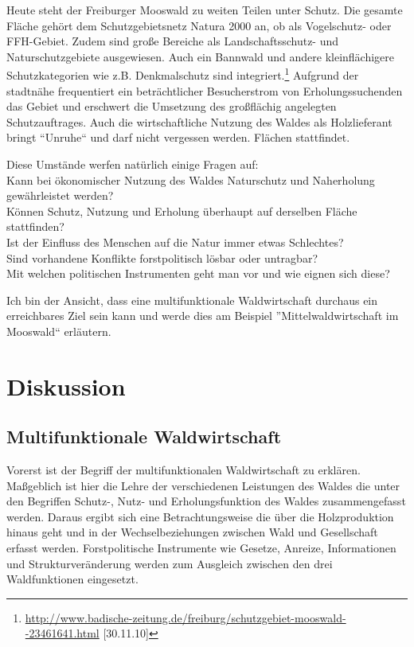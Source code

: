 \documentclass[12pt]{article}
\newcommand{\citefooturldate}[2]{\footnote{\url{#1} [#2]}}
\begin{document}
Heute steht der Freiburger Mooswald zu weiten Teilen unter Schutz. Die gesamte Fläche gehört dem
Schutzgebietsnetz Natura 2000 an, ob als Vogelschutz- oder FFH-Gebiet. Zudem sind große Bereiche
als Landschaftsschutz- und Naturschutzgebiete ausgewiesen. Auch ein Bannwald und andere kleinflächigere
Schutzkategorien wie z.B. Denkmalschutz sind integriert.\citefooturldate{http://www.badische-zeitung.de/freiburg/schutzgebiet-mooswald--23461641.html}{30.11.10} 
Aufgrund der stadtnähe frequentiert ein beträchtlicher Besucherstrom von Erholungssuchenden das Gebiet
und erschwert die Umsetzung des großflächig angelegten Schutzauftrages. Auch die wirtschaftliche Nutzung
des Waldes als Holzlieferant bringt ``Unruhe`` und darf nicht vergessen werden.
Flächen stattfindet.

\noindent Diese Umstände werfen natürlich einige Fragen auf:\\ 
Kann bei ökonomischer Nutzung des Waldes Naturschutz und Naherholung gewährleistet werden? \\
Können Schutz, Nutzung und Erholung überhaupt auf derselben Fläche stattfinden? \\
Ist der Einfluss des Menschen auf die Natur immer etwas Schlechtes? \\
Sind vorhandene Konflikte forstpolitisch lösbar oder untragbar? \\
Mit welchen politischen Instrumenten geht man vor und wie eignen sich diese?

Ich bin der Ansicht, dass eine multifunktionale Waldwirtschaft durchaus ein erreichbares 
Ziel sein kann und werde dies am Beispiel ''Mittelwaldwirtschaft im Mooswald`` erläutern. 


\section*{Diskussion}
\subsection*{Multifunktionale Waldwirtschaft}
Vorerst ist der Begriff der multifunktionalen Waldwirtschaft zu erklären. Maßgeblich ist
hier die Lehre der verschiedenen Leistungen des Waldes die unter den Begriffen Schutz-, Nutz-
und Erholungsfunktion des Waldes zusammengefasst werden. Daraus ergibt sich eine Betrachtungsweise
die über die Holzproduktion hinaus geht und in der Wechselbeziehungen zwischen Wald und Gesellschaft
erfasst werden. Forstpolitische Instrumente wie Gesetze, Anreize, Informationen und Strukturveränderung
werden zum Ausgleich zwischen den drei Waldfunktionen eingesetzt. 
\end{document}
